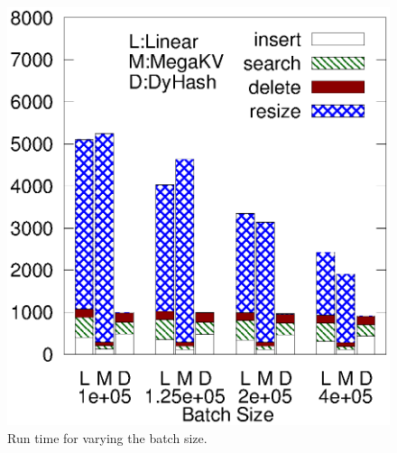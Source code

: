 \begin{figure}[htp]
\begin{minipage}{0.19\linewidth}
		\centerline{\dsali}
	\end{minipage}
	\begin{minipage}{0.19\linewidth}\centering
		\includegraphics[width=\linewidth]{pic/dynamic/random/diff_batch_size.eps}
		\centerline{\dsrandom}
	\end{minipage}
	\caption{Run time for varying the batch size.}
	\label{fig:vary-batch-size}
\end{figure}
